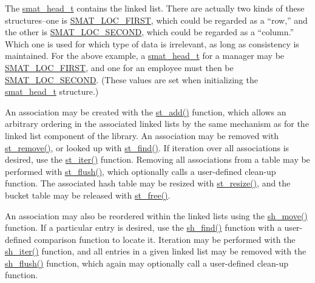 The \hyperlink{group__dbprim__smat_ga1}{smat\_\-head\_\-t} contains the linked list. There are actually two kinds of these structures--one is \hyperlink{group__dbprim__smat_gga70a137}{SMAT\_\-LOC\_\-FIRST}, which could be regarded as a ``row,'' and the other is \hyperlink{group__dbprim__smat_gga70a138}{SMAT\_\-LOC\_\-SECOND}, which could be regarded as a ``column.'' Which one is used for which type of data is irrelevant, as long as consistency is maintained. For the above example, a \hyperlink{group__dbprim__smat_ga1}{smat\_\-head\_\-t} for a manager may be \hyperlink{group__dbprim__smat_gga70a137}{SMAT\_\-LOC\_\-FIRST}, and one for an employee must then be \hyperlink{group__dbprim__smat_gga70a138}{SMAT\_\-LOC\_\-SECOND}. (These values are set when initializing the \hyperlink{group__dbprim__smat_ga1}{smat\_\-head\_\-t} structure.)

An association may be created with the \hyperlink{group__dbprim__smat_ga11}{st\_\-add()} function, which allows an arbitrary ordering in the associated linked lists by the same mechanism as for the linked list component of the library. An association may be removed with \hyperlink{group__dbprim__smat_ga12}{st\_\-remove()}, or looked up with \hyperlink{group__dbprim__smat_ga13}{st\_\-find()}. If iteration over all associations is desired, use the \hyperlink{group__dbprim__smat_ga14}{st\_\-iter()} function. Removing all associations from a table may be performed with \hyperlink{group__dbprim__smat_ga15}{st\_\-flush()}, which optionally calls a user-defined clean-up function. The associated hash table may be resized with \hyperlink{group__dbprim__smat_ga16}{st\_\-resize()}, and the bucket table may be released with \hyperlink{group__dbprim__smat_ga17}{st\_\-free()}.

An association may also be reordered within the linked lists using the \hyperlink{group__dbprim__smat_ga19}{sh\_\-move()} function. If a particular entry is desired, use the \hyperlink{group__dbprim__smat_ga20}{sh\_\-find()} function with a user-defined comparison function to locate it. Iteration may be performed with the \hyperlink{group__dbprim__smat_ga21}{sh\_\-iter()} function, and all entries in a given linked list may be removed with the \hyperlink{group__dbprim__smat_ga22}{sh\_\-flush()} function, which again may optionally call a user-defined clean-up function.

